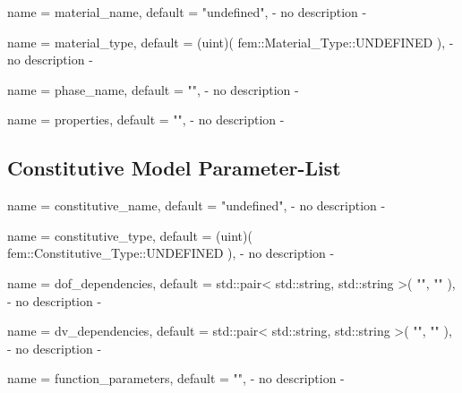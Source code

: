 \begin{parameter}{
    name    = {material_name},
    default = {"undefined"},
}
- no description -
\end{parameter}

\begin{parameter}{
    name    = {material_type},
    default = {(uint)( fem::Material_Type::UNDEFINED )},
}
- no description -
\end{parameter}

\begin{parameter}{
    name    = {phase_name},
    default = {""},
}
- no description -
\end{parameter}

\begin{parameter}{
    name    = {properties},
    default = {""},
}
- no description -
\end{parameter}

\subsection{Constitutive Model Parameter-List}

\begin{parameter}{
    name    = {constitutive_name},
    default = {"undefined"},
}
- no description -
\end{parameter}

\begin{parameter}{
    name    = {constitutive_type},
    default = {(uint)( fem::Constitutive_Type::UNDEFINED )},
}
- no description -
\end{parameter}

\begin{parameter}{
    name    = {dof_dependencies},
    default = {std::pair< std::string, std::string >( "", "" )},
}
- no description -
\end{parameter}

\begin{parameter}{
    name    = {dv_dependencies},
    default = {std::pair< std::string, std::string >( "", "" )},
}
- no description -
\end{parameter}

\begin{parameter}{
    name    = {function_parameters},
    default = {""},
}
- no description -
\end{parameter}

